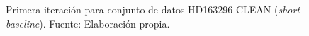 \begin{figure}[!ht]
 \caption[Primera iteración para conjunto de datos HD163296 CLEAN (\textit{short-baseline})]{Primera iteración para conjunto de datos HD163296 CLEAN (\textit{short-baseline}). Fuente: Elaboración propia.}
 \label{fig:real_short_p0_clean}
\end{figure}

